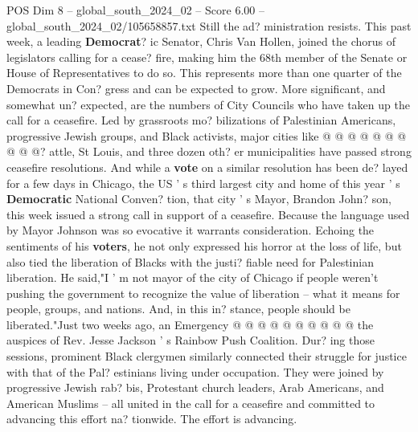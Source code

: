 \begin{textsample}{POS Dim 8 – global\_south\_2024\_02 – Score 6.00 – global\_south\_2024\_02/105658857.txt}
Still the ad? ministration resists.
This past week, a leading \textbf{Democrat}? ic Senator, Chris Van Hollen, joined the chorus of legislators calling for a cease? fire, making him the 68th member of the Senate or House of Representatives to do so.
This represents more than one quarter of the Democrats in Con? gress and can be expected to grow.
More significant, and somewhat un? expected, are the numbers of City Councils who have taken up the call for a ceasefire.
Led by grassroots mo? bilizations of Palestinian Americans, progressive Jewish groups, and Black activists, major cities like @ @ @ @ @ @ @ @ @ @? attle, St Louis, and three dozen oth? er municipalities have passed strong ceasefire resolutions.
And while a \textbf{vote} on a similar resolution has been de? layed for a few days in Chicago, the US ' s third largest city and home of this year ' s \textbf{Democratic} National Conven? tion, that city ' s Mayor, Brandon John? son, this week issued a strong call in support of a ceasefire.
Because the language used by Mayor Johnson was so evocative it warrants consideration.
Echoing the sentiments of his \textbf{voters}, he not only expressed his horror at the loss of life, but also tied the liberation of Blacks with the justi? fiable need for Palestinian liberation.
He said,"I ' m not mayor of the city of Chicago if people weren't pushing the government to recognize the value of liberation -- what it means for people, groups, and nations.
And, in this in? stance, people should be liberated."Just two weeks ago, an Emergency @ @ @ @ @ @ @ @ @ @ the auspices of Rev.
Jesse Jackson ' s Rainbow Push Coalition.
Dur? ing those sessions, prominent Black clergymen similarly connected their struggle for justice with that of the Pal? estinians living under occupation.
They were joined by progressive Jewish rab? bis, Protestant church leaders, Arab Americans, and American Muslims -- all united in the call for a ceasefire and committed to advancing this effort na? tionwide.
The effort is advancing.

\end{textsample}
